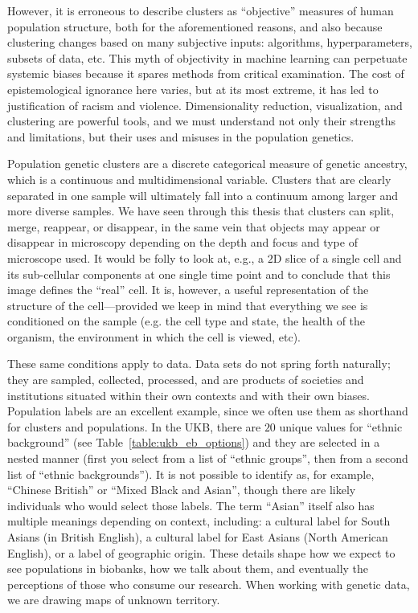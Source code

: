 However, it is erroneous to describe clusters as ``objective'' measures of human population structure, both for the aforementioned reasons, and also because clustering changes based on many subjective inputs: algorithms, hyperparameters, subsets of data, etc\citep{watson_philosophy_2023}. This myth of objectivity in machine learning can perpetuate systemic biases because it spares methods from critical examination\citep{gebru_race_2020}. The cost of epistemological ignorance here varies, but at its most extreme, it has led to justification of racism and violence\citep{panofsky_genetic_2019,panofsky_how_2021}. Dimensionality reduction, visualization, and clustering are powerful tools, and we must understand not only their strengths and limitations, but their uses and misuses in the population genetics\citep{carlson_counter_2022}. 

Population genetic clusters are a discrete categorical measure of genetic ancestry, which is a continuous and multidimensional variable. Clusters that are clearly separated in one sample will ultimately fall into a continuum among larger and more diverse samples\citep{lewis_getting_2022}. We have seen through this thesis that clusters can split, merge, reappear, or disappear, in the same vein that objects may appear or disappear in microscopy depending on the depth and focus and type of microscope used. It would be folly to look at, e.g., a $2$D slice of a single cell and its sub-cellular components at one single time point and to conclude that this image defines the ``real'' cell. It is, however, a useful representation of the structure of the cell---provided we keep in mind that everything we see is conditioned on the sample (e.g. the cell type and state, the health of the organism, the environment in which the cell is viewed, etc).

These same conditions apply to data. Data sets do not spring forth naturally; they are sampled, collected, processed, and are products of societies and institutions situated within their own contexts and with their own biases\citep{dignazio_data_2020}. Population labels are an excellent example, since we often use them as shorthand for clusters and populations. In the UKB, there are $20$ unique values for ``ethnic background'' (see Table~\ref{table:ukb_eb_options}) and they are selected in a nested manner (first you select from a list of ``ethnic groups'', then from a second list of ``ethnic backgrounds''). It is not possible to identify as, for example, ``Chinese British'' or ``Mixed Black and Asian'', though there are likely individuals who would select those labels. The term ``Asian'' itself also has multiple meanings depending on context, including: a cultural label for South Asians (in British English), a cultural label for East Asians (North American English), or a label of geographic origin. These details shape how we expect to see populations in biobanks, how we talk about them, and eventually the perceptions of those who consume our research. When working with genetic data, we are drawing maps of unknown territory.

